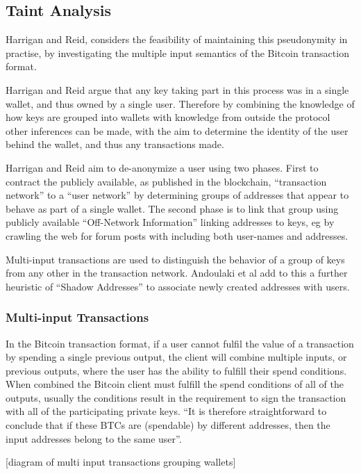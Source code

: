 \subsection{Taint Analysis} Harrigan and Reid, considers the feasibility of
maintaining this pseudonymity in practise, by investigating the multiple input
semantics of the Bitcoin transaction format\cite{reid-anon}. 

Harrigan and Reid argue that any key taking part in this process was in a single
wallet, and thus owned by a single user. Therefore by combining the knowledge of
how keys are grouped into wallets with knowledge from outside the protocol other
inferences can be made, with the aim to determine the identity of the user
behind the wallet, and thus any transactions made.

Harrigan and Reid aim to de-anonymize a user using two phases.  First to
contract the publicly available, as published in the blockchain, ``transaction
network'' to a ``user network” by determining groups of addresses that appear to
behave as part of a single wallet.  The second phase is to  link that group
using publicly available ``Off-Network Information'' linking addresses to keys,
eg by crawling the web for forum posts with including both user-names and
addresses.

Multi-input transactions are used to distinguish the behavior of a group of keys
from any other in the transaction network.  Andoulaki et al add to this a further
heuristic of ``Shadow Addresses'' to associate newly created addresses with
users\cite{eval-priv}.

\subsubsection{Multi-input Transactions}
In the Bitcoin transaction format, if a user cannot fulfil the value of a
transaction by spending a single previous output, the client will combine
multiple inputs, or previous outputs, where the user has the ability to fulfill
their spend conditions.  When combined the Bitcoin client must fulfill the spend
conditions of all of the outputs, usually the conditions result in the requirement to sign
the transaction with all of the participating private keys.  ``It is therefore
straightforward to conclude that if these BTCs are (spendable) by different addresses,
then the input addresses belong to the same user''\cite{eval-priv}.

[diagram of multi input transactions grouping wallets]

